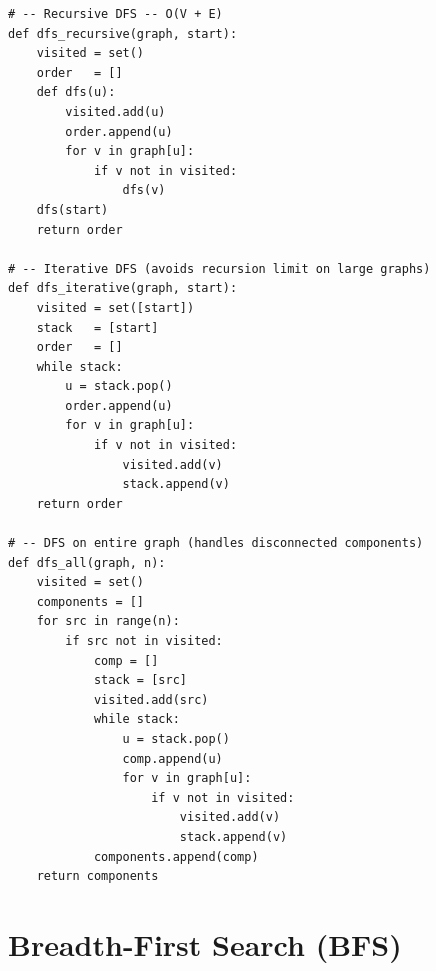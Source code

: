 \documentclass[11pt,a4paper]{report}
\begin{document}
\begin{lstlisting}
# -- Recursive DFS -- O(V + E)
def dfs_recursive(graph, start):
    visited = set()
    order   = []
    def dfs(u):
        visited.add(u)
        order.append(u)
        for v in graph[u]:
            if v not in visited:
                dfs(v)
    dfs(start)
    return order

# -- Iterative DFS (avoids recursion limit on large graphs)
def dfs_iterative(graph, start):
    visited = set([start])
    stack   = [start]
    order   = []
    while stack:
        u = stack.pop()
        order.append(u)
        for v in graph[u]:
            if v not in visited:
                visited.add(v)
                stack.append(v)
    return order

# -- DFS on entire graph (handles disconnected components)
def dfs_all(graph, n):
    visited = set()
    components = []
    for src in range(n):
        if src not in visited:
            comp = []
            stack = [src]
            visited.add(src)
            while stack:
                u = stack.pop()
                comp.append(u)
                for v in graph[u]:
                    if v not in visited:
                        visited.add(v)
                        stack.append(v)
            components.append(comp)
    return components
\end{lstlisting}

\section{Breadth-First Search (BFS)}
\end{document}
